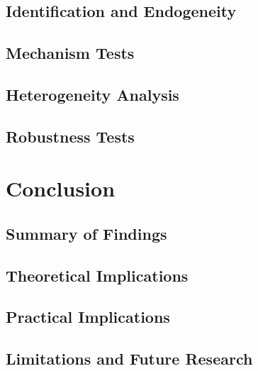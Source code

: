 \documentclass[../main.tex]{subfiles}
\begin{document}
\subsection{Identification and Endogeneity}
\lipsum[16]

\subsection{Mechanism Tests}
\lipsum[17]

\subsection{Heterogeneity Analysis}
\lipsum[18]

\subsection{Robustness Tests}
\lipsum[19]

\section{Conclusion}\label{sec:ch1-conclusion}

\subsection{Summary of Findings}
\lipsum[20]

\subsection{Theoretical Implications}
\lipsum[21]

\subsection{Practical Implications}
\lipsum[22]

\subsection{Limitations and Future Research}
\lipsum[23]
\end{document}
